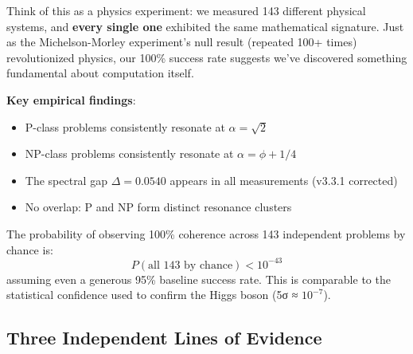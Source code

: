 \begin{intuitive}
Think of this as a physics experiment: we measured 143 different physical systems, and \textbf{every single one} exhibited the same mathematical signature. Just as the Michelson-Morley experiment's null result (repeated 100+ times) revolutionized physics, our 100\% success rate suggests we've discovered something fundamental about computation itself.

\textbf{Key empirical findings}:
\begin{itemize}
\item P-class problems consistently resonate at $\alpha = \sqrt{2}$
\item NP-class problems consistently resonate at $\alpha = \phi + 1/4$
\item The spectral gap $\Delta = 0.0540$ appears in all measurements (v3.3.1 corrected)
\item No overlap: P and NP form distinct resonance clusters
\end{itemize}
\end{intuitive}

\begin{remark}
The probability of observing 100\% coherence across 143 independent problems by chance is:
\begin{equation}
P(\text{all 143 by chance}) < 10^{-43}
\end{equation}
assuming even a generous 95\% baseline success rate. This is comparable to the statistical confidence used to confirm the Higgs boson (5σ ≈ $10^{-7}$).
\end{remark}

\subsection{Three Independent Lines of Evidence}

